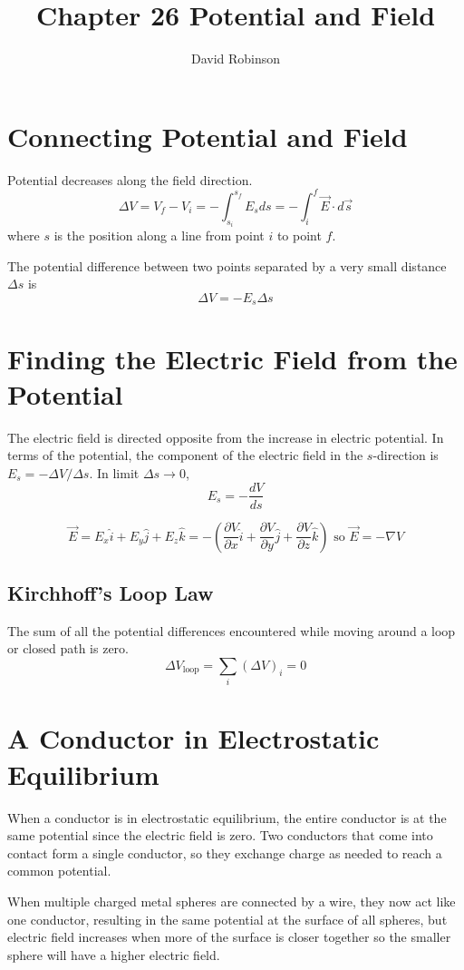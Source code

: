 \documentclass{article}
\title{Chapter 26 Potential and Field}
\author{David Robinson}
\date{}
\begin{document}
\maketitle

\section*{Connecting Potential and Field}

Potential decreases along the field direction.
\[\Delta V=V_f - V_i = -\int_{s_i}^{s_f} E_s ds=-\int_i^f \vec{E}\cdot d\vec{s}\] where $s$ is the
position along a line from point $i$ to point $f$.
\newline

The potential difference between two points separated by a very small distance $\Delta s$ is
\[\Delta V=-E_s \Delta s\]

\section*{Finding the Electric Field from the Potential}
The electric field is directed opposite from the increase in electric potential. In terms of the
potential, the component of the electric field in the $s$-direction is
$E_s = -\Delta V / \Delta s$. In limit $\Delta s\rightarrow 0$,
\[E_s = -\frac{dV}{ds}\]

\[\vec{E}=E_x\hat{i} + E_y\hat{j} + E_z\hat{k}=-(\frac{\partial V}{\partial x}\hat{i}+
\frac{\partial V}{\partial y}\hat{j}+\frac{\partial V}{\partial z}\hat{k})\text{ so }
\vec{E}=-\nabla V\]

\subsection*{Kirchhoff's Loop Law}
The sum of all the potential differences encountered while moving around a loop or closed path is
zero.
\[\Delta V_\text{loop}=\sum_i (\Delta V)_i=0\]
\section*{A Conductor in Electrostatic Equilibrium}

When a conductor is in electrostatic equilibrium, the entire conductor is at the same potential
since the electric field is zero. Two conductors that come into contact form a single conductor, so
they exchange charge as needed to reach a common potential.
\newline

When multiple charged metal spheres are connected by a wire, they now act like one conductor,
resulting in the same potential at the surface of all spheres, but electric field increases when
more of the surface is closer together so the smaller sphere will have a higher electric field.
\end{document}
